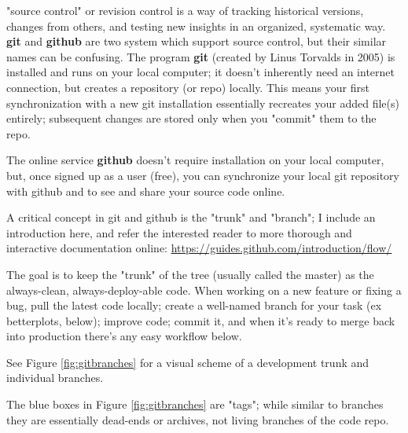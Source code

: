 \documentclass[logos,parttoc,morelanguage=french,morelanguage=german]{orsay-memoire}
\begin{document}
"\gls{source control}" or revision control is a way of tracking historical versions, changes from others, and testing new insights in an organized, systematic way. \textbf{git} and \textbf{github} are two system which support source control, but their similar names can be confusing. The program \textbf{git} (created by Linus Torvalds in 2005) is installed and runs on your local computer; it doesn't inherently need an internet connection, but creates a repository (or repo) locally. This means your first synchronization with a new git installation essentially recreates your added file(s) entirely; subsequent changes are stored only when you "commit" them to the repo.

The online service \textbf{github} doesn't require installation on your local computer, but, once signed up as a user (free), you can synchronize your local git repository with github and to see and share your source code online.

A critical concept in git and github is the "trunk" and "branch"; I include an introduction here, and refer the interested reader to more thorough and interactive documentation online: 
\href{https://guides.github.com/introduction/flow/}{https://guides.github.com/introduction/flow/}

The goal is to keep the "trunk" of the tree (usually called the master) as the always-clean, always-deploy-able code. When working on a new feature or fixing a bug, pull the latest code locally; create a well-named branch for your task (ex betterplots, below); improve code; commit it, and when it's ready to merge back into production there's any easy workflow below.

See Figure \ref{fig:gitbranches} for a visual scheme of a development trunk and individual branches. 


The blue boxes in Figure \ref{fig:gitbranches} are "tags"; while similar to branches they are essentially dead-ends or archives, not living branches of the code repo.
\end{document}
